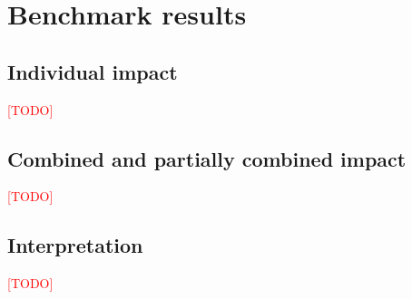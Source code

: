 
\section{Benchmark results} \label{results}
\subsection{Individual impact}
\textcolor{red}{[TODO]}
\subsection{Combined and partially combined impact}
\textcolor{red}{[TODO]}
\subsection{Interpretation}
\textcolor{red}{[TODO]}